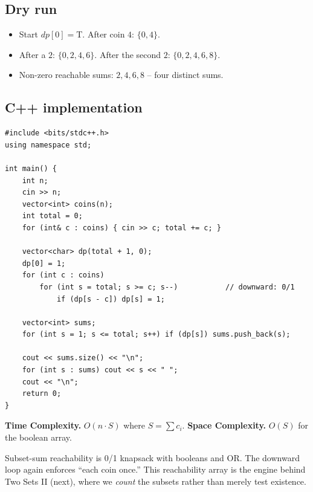\subsection*{Dry run}


\begin{itemize}
  \item Start $\textit{dp}[0]=$T. After coin $4$: $\{0,4\}$.
  \item After a $2$: $\{0,2,4,6\}$. After the second $2$:
        $\{0,2,4,6,8\}$.
  \item Non-zero reachable sums: $2,4,6,8$ -- four distinct sums.
\end{itemize}

\subsection*{C++ implementation}

\begin{lstlisting}
#include <bits/stdc++.h>
using namespace std;

int main() {
    int n;
    cin >> n;
    vector<int> coins(n);
    int total = 0;
    for (int& c : coins) { cin >> c; total += c; }

    vector<char> dp(total + 1, 0);
    dp[0] = 1;
    for (int c : coins)
        for (int s = total; s >= c; s--)           // downward: 0/1
            if (dp[s - c]) dp[s] = 1;

    vector<int> sums;
    for (int s = 1; s <= total; s++) if (dp[s]) sums.push_back(s);

    cout << sums.size() << "\n";
    for (int s : sums) cout << s << " ";
    cout << "\n";
    return 0;
}
\end{lstlisting}

\begin{complexitybox}
\textbf{Time Complexity.} $O(n\cdot S)$ where $S=\sum c_i$.
\textbf{Space Complexity.} $O(S)$ for the boolean array.
\end{complexitybox}

\begin{takeawaybox}
Subset-sum reachability is 0/1 knapsack with booleans and OR. The downward
loop again enforces ``each coin once.'' This reachability array is the
engine behind Two Sets II (next), where we \emph{count} the subsets rather
than merely test existence.
\end{takeawaybox}

